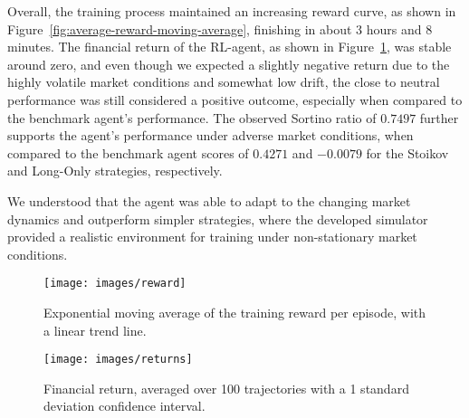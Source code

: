 
Overall, the training process maintained an increasing reward curve, as shown in Figure~\ref{fig:average-reward-moving-average},
finishing in about 3 hours and 8 minutes.
The financial return of the RL-agent, as shown in Figure~\ref{fig:average-financial-return}, was stable around zero,
and even though we expected a slightly negative return due to the highly volatile market conditions and
somewhat low drift, the close to neutral performance was still considered a positive outcome,
especially when compared to the benchmark agent's performance.
The observed Sortino ratio of $0.7497$ further supports the agent's performance under adverse market conditions,
when compared to the benchmark agent scores of $0.4271$ and $-0.0079$ for the Stoikov and Long-Only strategies, respectively.

We understood that the agent was able to adapt to the changing market dynamics and outperform simpler strategies,
where the developed simulator provided a realistic environment for training under non-stationary market conditions.

\begin{figure}[t]
    \centering
    \begin{minipage}{\columnwidth}
        \centering
        \texttt{[image: images/reward]}
        \caption{Exponential moving average of the training reward per episode, with a linear trend line.}
        \label{fig:average-reward-moving-average}
    \end{minipage}
    \vspace{0.04\textwidth} %
    \begin{minipage}{\columnwidth}
        \centering
        \texttt{[image: images/returns]}
        \caption{Financial return, averaged over 100 trajectories with a 1 standard deviation confidence interval.}
        \label{fig:average-financial-return}
    \end{minipage}
\end{figure}